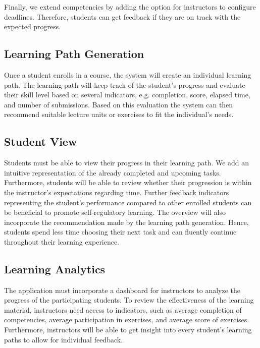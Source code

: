\documentclass[a4paper,12pt,twoside]{article}
\begin{document}
Finally, we extend competencies by adding the option for instructors to configure deadlines. Therefore, students can get feedback if they are on track with the
expected progress.

\subsection{Learning Path Generation}
Once a student enrolls in a course, the system will create an individual learning path. The learning path will keep track of the student's progress and evaluate
their skill level based on several indicators, e.g. completion, score, elapsed time, and number of submissions. Based on this evaluation the system can then
recommend suitable lecture units or exercises to fit the individual's needs.

\subsection{Student View}
Students must be able to view their progress in their learning path. We add an intuitive representation of the already completed and upcoming tasks.
Furthermore, students will be able to review whether their progression is within the instructor's expectations regarding time. Further feedback indicators
representing the student's performance compared to other enrolled students can be beneficial to promote self-regulatory learning.
The overview will also incorporate the recommendation made by the learning path generation. Hence, students spend less time choosing their next task and can fluently
continue throughout their learning experience.

\subsection{Learning Analytics}
The application must incorporate a dashboard for instructors to analyze the progress of the participating students. To review the effectiveness of the learning material,
instructors need access to indicators, such as average completion of competencies, average participation in exercises, and average score of exercises.
Furthermore, instructors will be able to get insight into every student's learning paths to allow for individual feedback.
\end{document}
